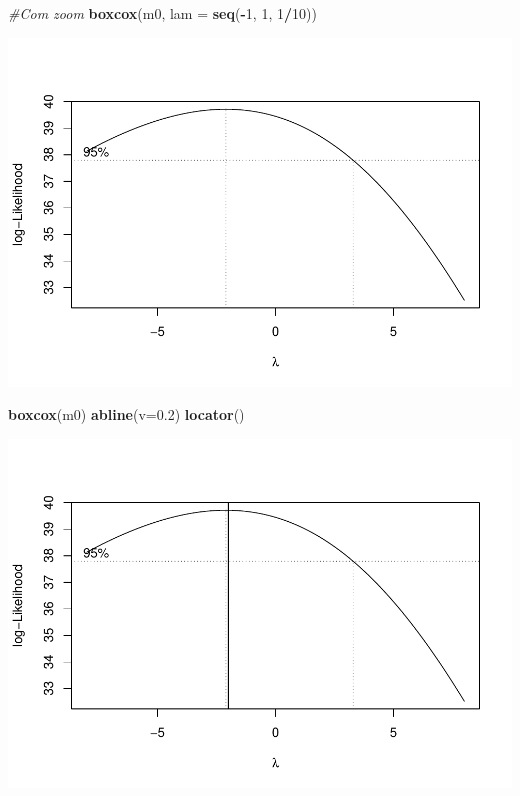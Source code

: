 \documentclass[
]{book}
\newenvironment{Shaded}{\begin{snugshade}}{\end{snugshade}}
\newcommand{\CommentTok}[1]{\textcolor[rgb]{0.56,0.35,0.01}{\textit{#1}}}
\newcommand{\DataTypeTok}[1]{\textcolor[rgb]{0.13,0.29,0.53}{#1}}
\newcommand{\DecValTok}[1]{\textcolor[rgb]{0.00,0.00,0.81}{#1}}
\newcommand{\FloatTok}[1]{\textcolor[rgb]{0.00,0.00,0.81}{#1}}
\newcommand{\KeywordTok}[1]{\textcolor[rgb]{0.13,0.29,0.53}{\textbf{#1}}}
\newcommand{\NormalTok}[1]{#1}
\newcommand{\OperatorTok}[1]{\textcolor[rgb]{0.81,0.36,0.00}{\textbf{#1}}}
\begin{document}
\begin{Shaded}
\begin{Highlighting}[]
  \CommentTok{#Com zoom}
  \KeywordTok{boxcox}\NormalTok{(m0, }\DataTypeTok{lam =} \KeywordTok{seq}\NormalTok{(}\OperatorTok{-}\DecValTok{1}\NormalTok{, }\DecValTok{1}\NormalTok{, }\DecValTok{1}\OperatorTok{/}\DecValTok{10}\NormalTok{))}
\end{Highlighting}
\end{Shaded}

\includegraphics{TudodoR_files/figure-latex/unnamed-chunk-291-2.pdf}

\begin{Shaded}
\begin{Highlighting}[]
  \KeywordTok{boxcox}\NormalTok{(m0)}
  \KeywordTok{abline}\NormalTok{(}\DataTypeTok{v=}\FloatTok{0.2}\NormalTok{)}
  \KeywordTok{locator}\NormalTok{()}
\end{Highlighting}
\end{Shaded}

\includegraphics{TudodoR_files/figure-latex/unnamed-chunk-292-1.pdf}
\end{document}
